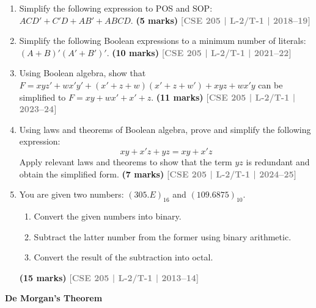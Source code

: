 \documentclass[12pt,a4paper]{article}
\newcommand{\yr}[1]{\hfill\textcolor{gray}{\small\textbf{[#1]}}}
\newcommand{\mk}[1]{\textcolor{orange!70!black}{\small\textbf{(#1 marks)}}}
\newcommand{\subtopic}[2]{%
  \vspace{10pt}
  \noindent\begin{tcolorbox}[colback=#1!8,colframe=#1,boxrule=0.6pt,arc=4pt,
    left=6pt,right=6pt,top=4pt,bottom=4pt]
    \small\bfseries\textcolor{#1}{#2}
  \end{tcolorbox}
  \vspace{2pt}
}
\begin{document}
\begin{enumerate}
\item Simplify the following expression to POS and SOP: $ACD' + C'D + AB' + ABCD$.
\mk{5} \yr{CSE 205 | L-2/T-1 | 2018--19}

\item Simplify the following Boolean expressions to a minimum number of literals: $(A + B)'(A'+B')'$.
\mk{10} \yr{CSE 205 | L-2/T-1 | 2021--22}

\item Using Boolean algebra, show that $F = xyz' + wx'y' + (x'+z+w)(x'+z+w') + xyz + wx'y$ can be simplified to $F = xy + wx' + x' + z$.
\mk{11} \yr{CSE 205 | L-2/T-1 | 2023--24}

\item Using laws and theorems of Boolean algebra, prove and simplify the following expression:
\[ xy + x'z + yz = xy + x'z \]
Apply relevant laws and theorems to show that the term $yz$ is redundant and obtain the simplified form.
\mk{7} \yr{CSE 205 | L-2/T-1 | 2024--25}



\item You are given two numbers: $(305.E)_{16}$ and $(109.6875)_{10}$.
\begin{enumerate}
  \item Convert the given numbers into binary.
  \item Subtract the latter number from the former using binary arithmetic.
  \item Convert the result of the subtraction into octal.
\end{enumerate}
\mk{15} \yr{CSE 205 | L-2/T-1 | 2013--14}

\end{enumerate}

\subtopic{cA}{De Morgan's Theorem}
\label{sub:s1-demorgan}
\end{document}
